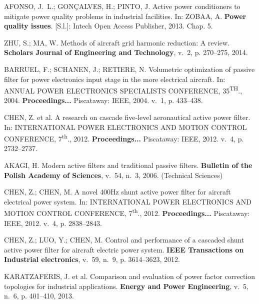 \begin{thebibliography}{}
{AFONSO, J.~L.; GON{\c{C}}ALVES, H.; PINTO, J. Active power conditioners to
	 mitigate power quality problems in industrial facilities.
	 In: ZOBAA, A. \textbf{Power quality issues}.
     [S.l.]: Intech Open Access Publisher, 2013. Chap. 5.}

{ZHU, S.; MA, W. Methods of aircraft grid harmonic reduction: A review.
\textbf{Scholars Journal of Engineering and Technology}, v.~2, p.
  270--275, 2014.}

{BARRUEL, F.; SCHANEN, J.; RETIERE, N. Volumetric optimization of passive
  filter for power electronics input stage in the more electrical aircraft. In:
  \uppercase{Annual Power Electronics Specialists Conference, 35\textsuperscript{\lowercase{th}}., 2004.}
  \textbf{Proceedings...} Piscataway: IEEE, 2004. v.~1, p. 433--438.}

{CHEN, Z. et al. A research on cascade five-level aeronautical active power
  filter. In: \uppercase{International Power Electronics and Motion
  Control Conference,} 7\textsuperscript{th}., 2012. \textbf{Proceedings...} Piscataway: IEEE, 2012. v.~4, p. 2732--2737.}

{AKAGI, H. Modern active filters and traditional passive filters.
\textbf{Bulletin of the Polish Academy of Sciences}, v.~54,
  n.~3, 2006. (Technical Sciences)}

{CHEN, Z.; CHEN, M. A novel 400Hz shunt active power filter for aircraft
  electrical power system. In: \uppercase{International Power Electronics and Motion
  	Control Conference,} 7\textsuperscript{th}., 2012. \textbf{Proceedings...} Piscataway: IEEE, 2012. v.~4, p.
  2838--2843.}

{CHEN, Z.; LUO, Y.; CHEN, M. Control and performance of a cascaded shunt active
  power filter for aircraft electric power system.
\textbf{IEEE Transactions on Industrial electronics}, v.~59, n.~9, p.
  3614--3623, 2012.}

{KARATZAFERIS, J. et al. Comparison and evaluation of power factor correction
  topologies for industrial applications.
\textbf{Energy and Power Engineering}, v.~5, n.~6, p. 401--410, 2013.}


\end{thebibliography}
